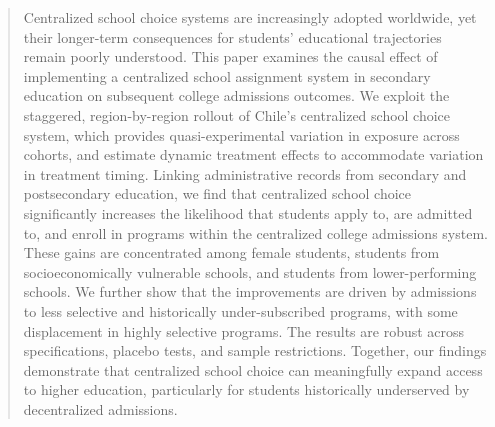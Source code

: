 \begin{abstract}
Centralized school choice systems are increasingly adopted worldwide, yet their longer-term consequences for students' educational trajectories remain poorly understood. This paper examines the causal effect of implementing a centralized school assignment system in secondary education on subsequent college admissions outcomes. We exploit the staggered, region-by-region rollout of Chile's centralized school choice system, which provides quasi-experimental variation in exposure across cohorts, and estimate dynamic treatment effects to accommodate variation in treatment timing. Linking administrative records from secondary and postsecondary education, we find that centralized school choice significantly increases the likelihood that students apply to, are admitted to, and enroll in programs within the centralized college admissions system. These gains are concentrated among female students, students from socioeconomically vulnerable schools, and students from lower-performing schools. We further show that the improvements are driven by admissions to less selective and historically under-subscribed programs, with some displacement in highly selective programs. The results are robust across specifications, placebo tests, and sample restrictions. Together, our findings demonstrate that centralized school choice can meaningfully expand access to higher education, particularly for students historically underserved by decentralized admissions.
\end{abstract}
